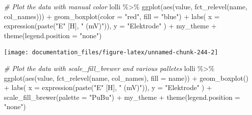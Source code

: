 \documentclass[
]{article}
\newenvironment{Shaded}{\begin{snugshade}}{\end{snugshade}}
\newcommand{\AttributeTok}[1]{\textcolor[rgb]{0.77,0.63,0.00}{#1}}
\newcommand{\CommentTok}[1]{\textcolor[rgb]{0.56,0.35,0.01}{\textit{#1}}}
\newcommand{\FunctionTok}[1]{\textcolor[rgb]{0.00,0.00,0.00}{#1}}
\newcommand{\NormalTok}[1]{#1}
\newcommand{\SpecialCharTok}[1]{\textcolor[rgb]{0.00,0.00,0.00}{#1}}
\newcommand{\StringTok}[1]{\textcolor[rgb]{0.31,0.60,0.02}{#1}}
\begin{document}
\begin{Shaded}
\begin{Highlighting}[]

\CommentTok{\# Plot the data with manual color}
\NormalTok{lolli }\SpecialCharTok{\%\textgreater{}\%}
  \FunctionTok{ggplot}\NormalTok{(}\FunctionTok{aes}\NormalTok{(value, }\FunctionTok{fct\_relevel}\NormalTok{(name, col\_names))) }\SpecialCharTok{+} 
  \FunctionTok{geom\_boxplot}\NormalTok{(}\AttributeTok{color =} \StringTok{"red"}\NormalTok{, }\AttributeTok{fill =} \StringTok{"blue"}\NormalTok{) }\SpecialCharTok{+}
  \FunctionTok{labs}\NormalTok{(}
    \AttributeTok{x =} \FunctionTok{expression}\NormalTok{(}\FunctionTok{paste}\NormalTok{(}\StringTok{"E"}\NormalTok{ [H], }\StringTok{" (mV)"}\NormalTok{)),}
    \AttributeTok{y =} \StringTok{"Elektrode"}
\NormalTok{  ) }\SpecialCharTok{+}
\NormalTok{  my\_theme }\SpecialCharTok{+}
  \FunctionTok{theme}\NormalTok{(}\AttributeTok{legend.position =} \StringTok{"none"}\NormalTok{)}
\end{Highlighting}
\end{Shaded}

\begin{center}\texttt{[image: documentation\_files/figure-latex/unnamed-chunk-244-2]} \end{center}

\begin{Shaded}
\begin{Highlighting}[]

\CommentTok{\# Plot the data with scale\_fill\_brewer and various palletes}
\NormalTok{lolli }\SpecialCharTok{\%\textgreater{}\%}
  \FunctionTok{ggplot}\NormalTok{(}\FunctionTok{aes}\NormalTok{(value, }\FunctionTok{fct\_relevel}\NormalTok{(name, col\_names), }\AttributeTok{fill =}\NormalTok{ name)) }\SpecialCharTok{+} 
  \FunctionTok{geom\_boxplot}\NormalTok{() }\SpecialCharTok{+}
  \FunctionTok{labs}\NormalTok{(}
    \AttributeTok{x =} \FunctionTok{expression}\NormalTok{(}\FunctionTok{paste}\NormalTok{(}\StringTok{"E"}\NormalTok{ [H], }\StringTok{" (mV)"}\NormalTok{)),}
    \AttributeTok{y =} \StringTok{"Elektrode"}
\NormalTok{  ) }\SpecialCharTok{+}
  \FunctionTok{scale\_fill\_brewer}\NormalTok{(}\AttributeTok{palette =} \StringTok{"PuBu"}\NormalTok{) }\SpecialCharTok{+}
\NormalTok{  my\_theme }\SpecialCharTok{+}
  \FunctionTok{theme}\NormalTok{(}\AttributeTok{legend.position =} \StringTok{"none"}\NormalTok{)}
\end{Highlighting}
\end{Shaded}
\end{document}

